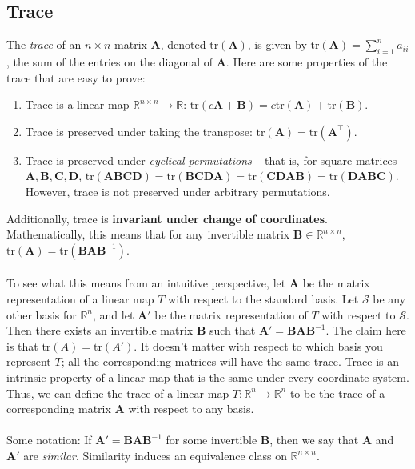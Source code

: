 \documentclass{article}
\begin{document}
\subsection{Trace}
The \textit{trace} of an $n \times n$ matrix $\mathbf{A}$, denoted $\text{tr}(\mathbf{A})$, is given by $\text{tr}(\mathbf{A}) = \sum_{i = 1}^n a_{ii}$, the sum of the entries on the diagonal of $\mathbf{A}$. Here are some properties of the trace that are easy to prove:
\begin{enumerate}[label=(\alph*)]
\item Trace is a linear map $\mathbb{R}^{n \times n} \to \mathbb{R}$: $\text{tr}(c\mathbf{A + B}) = c\text{tr}(\mathbf{A}) + \text{tr}(\mathbf{B})$.
\item Trace is preserved under taking the transpose: $\text{tr}(\mathbf{A}) = \text{tr}(\mathbf{A}^\top)$.
\item Trace is preserved under \textit{cyclical permutations} -- that is, for square matrices $\mathbf{A, B, C, D}$, $\text{tr}(\mathbf{ABCD}) = \text{tr}(\mathbf{BCDA}) = \text{tr}(\mathbf{CDAB}) = \text{tr}(\mathbf{DABC})$. However, trace is not preserved under arbitrary permutations.
\end{enumerate}
Additionally, trace is \textbf{invariant under change of coordinates}. Mathematically, this means that for any invertible matrix $\mathbf{B} \in \mathbb{R}^{n\times n}$, $\text{tr}(\mathbf{A}) = \text{tr}(\mathbf{BAB}^{-1})$. 
\\ \\
To see what this means from an intuitive perspective, let $\mathbf{A}$ be the matrix representation of a linear map $T$ with respect to the standard basis. Let $\mathcal{S}$ be any other basis for $\mathbb{R}^n$, and let $\mathbf{A}'$ be the matrix representation of $T$ with respect to $\mathcal{S}$. Then there exists an invertible matrix $\mathbf{B}$ such that $\mathbf{A}' = \mathbf{BAB}^{-1}$. The claim here is that $\text{tr}(A) = \text{tr}(A')$. It doesn't matter with respect to which basis you represent $T$; all the corresponding matrices will have the same trace. Trace is an intrinsic property of a linear map that is the same under every coordinate system. Thus, we can define the trace of a linear map $T: \mathbb{R}^n \to  \mathbb{R}^n$ to be the trace of a corresponding matrix $\mathbf{A}$ with respect to any basis. 
\\ \\
Some notation: If $\mathbf{A}' = \mathbf{BAB}^{-1}$ for some invertible $\mathbf{B}$, then we say that $\mathbf{A}$ and $\mathbf{A}'$ are \textit{similar}. Similarity induces an equivalence class on $\mathbb{R}^{n \times n}$. 
\end{document}
